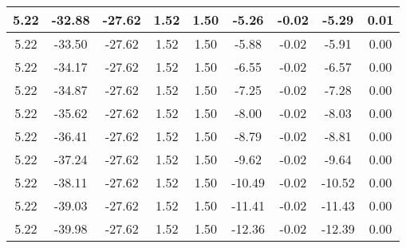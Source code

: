 \begin{table}[htbp]
\begin{adjustbox}{angle=90}
\begin{tabular}{|c|c|c|c|c|c|c|c|c|}
 5.22 & -32.88 & -27.62 & 1.52 & 1.50 & -5.26 & -0.02 & -5.29 & 0.01\\ \hline
 5.22 & -33.50 & -27.62 & 1.52 & 1.50 & -5.88 & -0.02 & -5.91 & 0.00\\ \hline
 5.22 & -34.17 & -27.62 & 1.52 & 1.50 & -6.55 & -0.02 & -6.57 & 0.00\\ \hline
 5.22 & -34.87 & -27.62 & 1.52 & 1.50 & -7.25 & -0.02 & -7.28 & 0.00\\ \hline
 5.22 & -35.62 & -27.62 & 1.52 & 1.50 & -8.00 & -0.02 & -8.03 & 0.00\\ \hline
 5.22 & -36.41 & -27.62 & 1.52 & 1.50 & -8.79 & -0.02 & -8.81 & 0.00\\ \hline
 5.22 & -37.24 & -27.62 & 1.52 & 1.50 & -9.62 & -0.02 & -9.64 & 0.00\\ \hline
 5.22 & -38.11 & -27.62 & 1.52 & 1.50 & -10.49 & -0.02 & -10.52 & 0.00\\ \hline
 5.22 & -39.03 & -27.62 & 1.52 & 1.50 & -11.41 & -0.02 & -11.43 & 0.00\\ \hline
 5.22 & -39.98 & -27.62 & 1.52 & 1.50 & -12.36 & -0.02 & -12.39 & 0.00\\ \hline
            \end{tabular}
        \end{adjustbox}
        \caption{}
        \label{}
    \end{table}
    